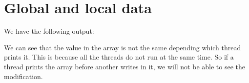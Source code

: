 \chapter{Global and local data}

We have the following output:



We can see that the value in the array is not the same depending which thread prints it. This is because all the threads do not run at the same time. So if a thread prints the array before another writes in it, we will not be able to see the modification.
